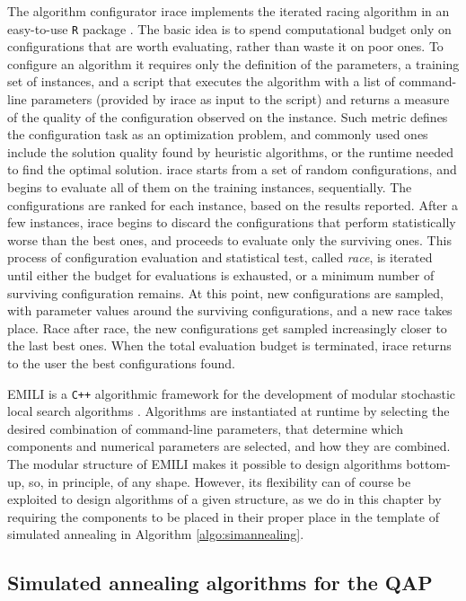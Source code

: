 The algorithm configurator irace implements the iterated racing algorithm 
in an easy-to-use \texttt{R} package
\cite{LopDubPerStuBir2016irace,BirStuPaqVar02:gecco,MarMoo1997air}. 
The basic idea is to spend computational budget only on configurations
that are worth evaluating, rather than waste it on poor ones.
To configure an algorithm it requires only the definition of the parameters,
a training set of instances, and a script that executes the algorithm with 
a list of command-line parameters (provided by irace as input to the script) 
and returns a measure of the quality of the configuration observed on the instance. 
Such metric defines the configuration task as an optimization problem, and commonly 
used ones include the solution quality found by heuristic algorithms, 
or the runtime needed to find the optimal solution.
irace starts from a set of random configurations, and begins to evaluate all of them 
on the training instances, sequentially. The configurations are ranked for each instance, 
based on the results reported. After a few instances, irace begins to discard the configurations 
that perform statistically worse than the best ones, and proceeds to evaluate only the surviving ones. 
This process of configuration evaluation and statistical test, called \textit{race}, 
is iterated until either the budget for evaluations is exhausted, or a minimum number 
of surviving configuration remains. At this point, new configurations are sampled, 
with parameter values around the surviving configurations, and a new race takes place. 
Race after race, the new configurations get sampled increasingly closer to the last best ones.
When the total evaluation budget is terminated, irace returns to the user the best configurations found.

EMILI is a \texttt{C++} algorithmic framework for the development of modular 
stochastic local search algorithms \cite{PagStu2019:ejor}.
Algorithms are instantiated at runtime by selecting the desired combination of 
command-line parameters, that determine which components and numerical parameters 
are selected, and how they are combined.
The modular structure of EMILI makes it possible to design algorithms
bottom-up, so, in principle, of any shape.
However, its flexibility can of course be exploited to design algorithms 
of a given structure, as we do in this chapter by requiring the components 
to be placed in their proper place in the template of simulated annealing
in Algorithm \ref{algo:simannealing}.

\subsection{Simulated annealing algorithms for the QAP}
\label{sec:expsqap}

